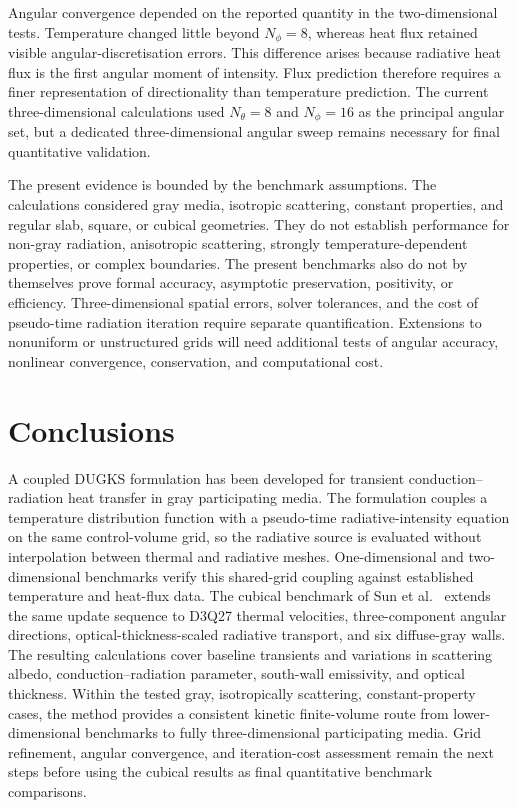 \documentclass[a4paper,12pt]{ctexart}
\numberwithin{equation}{section}
\begin{document}
Angular convergence depended on the reported quantity in the two-dimensional tests. Temperature changed little beyond $N_\phi=8$, whereas heat flux retained visible angular-discretisation errors. This difference arises because radiative heat flux is the first angular moment of intensity. Flux prediction therefore requires a finer representation of directionality than temperature prediction. The current three-dimensional calculations used $N_\theta=8$ and $N_\phi=16$ as the principal angular set, but a dedicated three-dimensional angular sweep remains necessary for final quantitative validation.

The present evidence is bounded by the benchmark assumptions. The calculations considered gray media, isotropic scattering, constant properties, and regular slab, square, or cubical geometries. They do not establish performance for non-gray radiation, anisotropic scattering, strongly temperature-dependent properties, or complex boundaries. The present benchmarks also do not by themselves prove formal accuracy, asymptotic preservation, positivity, or efficiency. Three-dimensional spatial errors, solver tolerances, and the cost of pseudo-time radiation iteration require separate quantification. Extensions to nonuniform or unstructured grids will need additional tests of angular accuracy, nonlinear convergence, conservation, and computational cost.


\section{Conclusions}
\label{sec:conclusions}

A coupled DUGKS formulation has been developed for transient conduction--radiation heat transfer in gray participating media. The formulation couples a temperature distribution function with a pseudo-time radiative-intensity equation on the same control-volume grid, so the radiative source is evaluated without interpolation between thermal and radiative meshes. One-dimensional and two-dimensional benchmarks verify this shared-grid coupling against established temperature and heat-flux data. The cubical benchmark of Sun et al.~\cite{SunMaLi2012} extends the same update sequence to D3Q27 thermal velocities, three-component angular directions, optical-thickness-scaled radiative transport, and six diffuse-gray walls. The resulting calculations cover baseline transients and variations in scattering albedo, conduction--radiation parameter, south-wall emissivity, and optical thickness. Within the tested gray, isotropically scattering, constant-property cases, the method provides a consistent kinetic finite-volume route from lower-dimensional benchmarks to fully three-dimensional participating media. Grid refinement, angular convergence, and iteration-cost assessment remain the next steps before using the cubical results as final quantitative benchmark comparisons.



\end{document}

